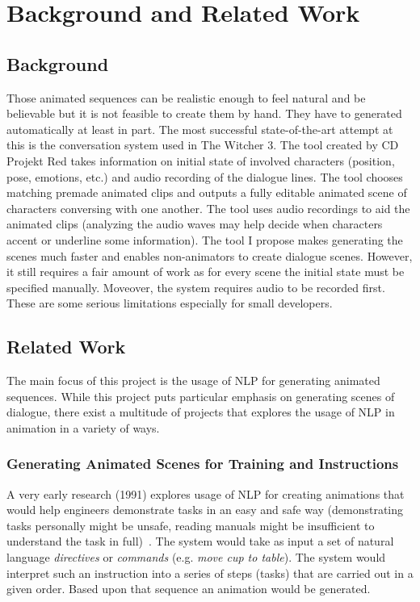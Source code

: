 \chapter{Background and Related Work \label{chap:background}}

\section{Background}
Those animated sequences can be realistic enough to feel natural and be believable but it is not feasible to create them by hand. They have to generated automatically at least in part. The most successful state-of-the-art attempt at this is the conversation system used in The Witcher 3. The tool created by CD Projekt Red takes information on initial state of involved characters (position, pose, emotions, etc.) and audio recording of the dialogue lines. The tool chooses matching premade animated clips and outputs a fully editable animated scene of characters conversing with one another. The tool uses audio recordings to aid the animated clips (analyzing the audio waves may help decide when characters accent or underline some information).
The tool I propose makes generating the scenes much faster and enables non-animators to create dialogue scenes. However, it still requires a fair amount of work as for every scene the initial state must be specified manually. Moveover, the system requires audio to be recorded first. These are some serious limitations especially for small developers. ~\cite{gdcwitcher}

\section{Related Work}
The main focus of this project is the usage of NLP for generating animated sequences. While this project puts particular emphasis on generating scenes of dialogue, there exist a multitude of projects that explores the usage of NLP in animation in a variety of ways.

\subsection{Generating Animated Scenes for Training and Instructions}
A very early research (1991) explores usage of NLP for creating animations that would help engineers demonstrate tasks in an easy and safe way (demonstrating tasks personally might be unsafe, reading manuals might be insufficient to understand the task in full)~\cite{animosha}. The system would take as input a set of natural language \textit{directives} or \textit{commands} (e.g. \textit{move cup to table}). The system would interpret such an instruction into a series of steps (tasks) that are carried out in a given order. Based upon that sequence an animation would be generated.

